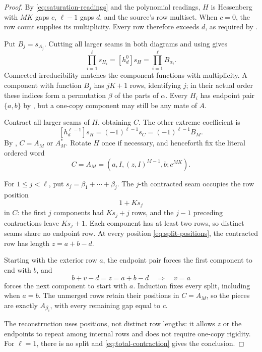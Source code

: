 \documentclass[11pt,a4paper]{amsart}
\numberwithin{equation}{section}
\theoremstyle{plain}
\theoremstyle{definition}
\begin{document}
\begin{proof}
By \eqref{eq:saturation-readings} and the polynomial readings, \(H\)
is Hessenberg with \(MK\) gaps \(c\), \(\ell-1\) gaps \(d\),
and the source's row multiset.  When \(c=0\), the row count supplies
its multiplicity.  Every row therefore exceeds \(d\), as required by
.

Put \(B_j=s_{A_j}\).  Cutting all larger seams in both diagrams and
using  gives
\begin{equation}\label{eq:cut-components}
 \prod_{i=1}^{\ell}s_{H_i}
 =[h_d^0]s_H
 =\prod_{i=1}^{\ell}B_{\alpha_i}.
\end{equation}
Connected irreducibility matches the component functions with
multiplicity.  A component with function \(B_j\) has \(jK+1\)
rows, identifying \(j\); in their actual order these indices form a
permutation \(\beta\) of the parts of \(\alpha\).
Every \(H_i\) has endpoint pair \(\{a,b\}\) by
, but a one-copy component may still be
any mate of \(A\).

Contract all larger seams of \(H\), obtaining \(C\).  The other
extreme coefficient is
\begin{equation}\label{eq:total-contraction}
 [h_d^{\ell-1}]s_H=(-1)^{\ell-1}s_C
 =(-1)^{\ell-1}B_M.
\end{equation}
By , \(C=A_M\) or \(A_M^*\).
Rotate \(H\) once if necessary, and henceforth fix the literal
ordered word
\[
 C=A_M=(a,I,(z,I)^{M-1},b;c^{MK}).
\]

For \(1\le j<\ell\), put \(s_j=\beta_1+\cdots+\beta_j\).
The \(j\)-th contracted seam occupies the row position
\begin{equation}\label{eq:split-positions}
 1+Ks_j
\end{equation}
in \(C\): the first \(j\) components had \(Ks_j+j\) rows, and
the \(j-1\) preceding contractions leave \(Ks_j+1\).
Each component has at least two rows, so distinct seams share no
endpoint row.  At every position \eqref{eq:split-positions}, the
contracted row has length \(z=a+b-d\).

Starting with the exterior row \(a\), the endpoint pair forces the
first component to end with \(b\), and
\[
 b+v-d=z=a+b-d\quad\Longrightarrow\quad v=a
\]
forces the next component to start with \(a\).  Induction fixes every
split, including when \(a=b\).  The unmerged rows retain their
positions in \(C=A_M\), so the pieces are exactly \(A_{\beta_i}\),
with every remaining gap equal to \(c\).

The reconstruction uses positions, not distinct row lengths: it allows
\(z\) or the endpoints to repeat among internal rows and does not
require one-copy rigidity.  For \(\ell=1\), there is no split and
\eqref{eq:total-contraction} gives the conclusion.
\end{proof}
\end{document}
